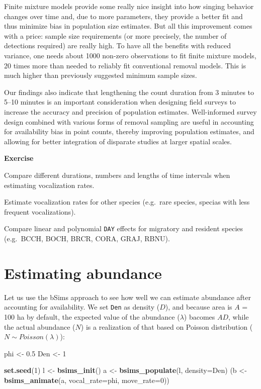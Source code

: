 \documentclass[12pt,]{book}
\newenvironment{Shaded}{\begin{snugshade}}{\end{snugshade}}
\newcommand{\DataTypeTok}[1]{\textcolor[rgb]{0.13,0.29,0.53}{#1}}
\newcommand{\DecValTok}[1]{\textcolor[rgb]{0.00,0.00,0.81}{#1}}
\newcommand{\FloatTok}[1]{\textcolor[rgb]{0.00,0.00,0.81}{#1}}
\newcommand{\KeywordTok}[1]{\textcolor[rgb]{0.13,0.29,0.53}{\textbf{#1}}}
\newcommand{\NormalTok}[1]{#1}
\newcommand{\StringTok}[1]{\textcolor[rgb]{0.31,0.60,0.02}{#1}}
\let\BeginKnitrBlock\begin \let\EndKnitrBlock\end
\begin{document}
Finite mixture models provide some really nice insight into how singing behavior changes over time and, due to more parameters, they provide a better fit and thus minimize bias in population size estimates. But all this improvement comes with a price: sample size requirements (or more precisely, the number of detections required) are really high. To have all the benefits with reduced variance, one needs about 1000 non-zero observations to fit finite mixture models, 20 times more than needed to reliably fit conventional removal models. This is much higher than previously suggested minimum sample sizes.

Our findings also indicate that lengthening the count duration from 3 minutes to 5--10 minutes is an important consideration when designing field surveys to increase the accuracy and precision of population estimates. Well-informed survey design combined with various forms of removal sampling are useful in accounting for availability bias in point counts, thereby improving population estimates, and allowing for better integration of disparate studies at larger spatial scales.

\BeginKnitrBlock{rmdexercise}
\textbf{Exercise}

Compare different durations, numbers and lengths of time intervals when estimating vocalization rates.

Estimate vocalization rates for other species (e.g.~rare species, specias with less frequent vocalizations).

Compare linear and polynomial \texttt{DAY} effects for migratory and resident species (e.g.~BCCH, BOCH, BRCR, CORA, GRAJ, RBNU).
\EndKnitrBlock{rmdexercise}

\hypertarget{estimating-abundance}{%
\section{Estimating abundance}\label{estimating-abundance}}

Let us use the bSims approach to see how well we can estimate abundance
after accounting for availability. We set \texttt{Den} as density (\(D\)), and because
area is \(A\) = 100 ha by default, the expected value of the abundance (\(\lambda\))
bacomes \(AD\), while the actual abundance (\(N\)) is a realization of that
based on Poisson distribution (\(N \sim Poisson(\lambda)\)):

\begin{Shaded}
\begin{Highlighting}[]
\NormalTok{phi <-}\StringTok{ }\FloatTok{0.5}
\NormalTok{Den <-}\StringTok{ }\DecValTok{1}

\KeywordTok{set.seed}\NormalTok{(}\DecValTok{1}\NormalTok{)}
\NormalTok{l <-}\StringTok{ }\KeywordTok{bsims_init}\NormalTok{()}
\NormalTok{a <-}\StringTok{ }\KeywordTok{bsims_populate}\NormalTok{(l, }\DataTypeTok{density=}\NormalTok{Den)}
\NormalTok{(b <-}\StringTok{ }\KeywordTok{bsims_animate}\NormalTok{(a, }\DataTypeTok{vocal_rate=}\NormalTok{phi, }\DataTypeTok{move_rate=}\DecValTok{0}\NormalTok{))}
\end{Highlighting}
\end{Shaded}
\end{document}
